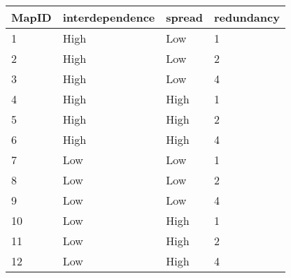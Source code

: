 \begin{tabular}{|l|l|l|l|}
\hline
\textbf{MapID} & \textbf{interdependence} & \textbf{spread} & \textbf{redundancy} \\ \hline
1 & High & Low & 1 \\ \hline
2 & High & Low & 2 \\ \hline
3 & High & Low & 4 \\ \hline
4 & High & High & 1 \\ \hline
5 & High & High & 2 \\ \hline
6 & High & High & 4 \\ \hline
7 & Low & Low & 1 \\ \hline
8 & Low & Low & 2 \\ \hline
9 & Low & Low & 4 \\ \hline
10 & Low & High & 1 \\ \hline
11 & Low & High & 2 \\ \hline
12 & Low & High & 4 \\ \hline
\end{tabular}\\
